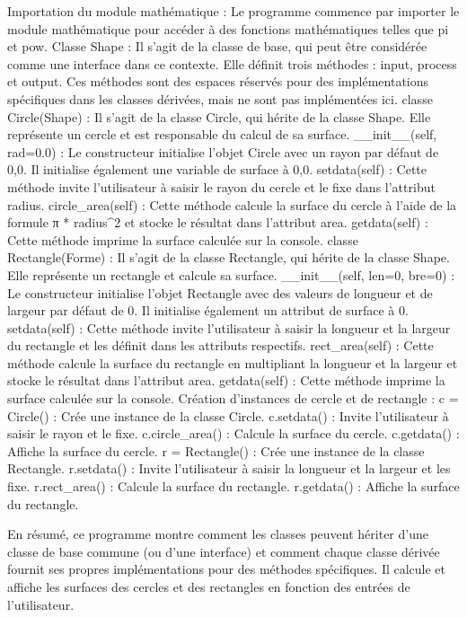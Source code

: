 \begin{solution}
    Importation du module mathématique : Le programme commence par importer le module mathématique pour accéder à des fonctions mathématiques telles que pi et pow.
    Classe Shape : Il s'agit de la classe de base, qui peut être considérée comme une interface dans ce contexte. Elle définit trois méthodes : input, process et output. Ces méthodes sont des espaces réservés pour des implémentations spécifiques dans les classes dérivées, mais ne sont pas implémentées ici.
    classe Circle(Shape) : Il s'agit de la classe Circle, qui hérite de la classe Shape. Elle représente un cercle et est responsable du calcul de sa surface.
        __init__(self, rad=0.0) : Le constructeur initialise l'objet Circle avec un rayon par défaut de 0,0. Il initialise également une variable de surface à 0,0.
        setdata(self) : Cette méthode invite l'utilisateur à saisir le rayon du cercle et le fixe dans l'attribut radius.
        circle_area(self) : Cette méthode calcule la surface du cercle à l'aide de la formule π * radius^2 et stocke le résultat dans l'attribut area.
        getdata(self) : Cette méthode imprime la surface calculée sur la console.
    classe Rectangle(Forme) : Il s'agit de la classe Rectangle, qui hérite de la classe Shape. Elle représente un rectangle et calcule sa surface.
        __init__(self, len=0, bre=0) : Le constructeur initialise l'objet Rectangle avec des valeurs de longueur et de largeur par défaut de 0. Il initialise également un attribut de surface à 0.
        setdata(self) : Cette méthode invite l'utilisateur à saisir la longueur et la largeur du rectangle et les définit dans les attributs respectifs.
        rect_area(self) : Cette méthode calcule la surface du rectangle en multipliant la longueur et la largeur et stocke le résultat dans l'attribut area.
        getdata(self) : Cette méthode imprime la surface calculée sur la console.
    Création d'instances de cercle et de rectangle :
        c = Circle() : Crée une instance de la classe Circle.
        c.setdata() : Invite l'utilisateur à saisir le rayon et le fixe.
        c.circle_area() : Calcule la surface du cercle.
        c.getdata() : Affiche la surface du cercle.
        r = Rectangle() : Crée une instance de la classe Rectangle.
        r.setdata() : Invite l'utilisateur à saisir la longueur et la largeur et les fixe.
        r.rect_area() : Calcule la surface du rectangle.
        r.getdata() : Affiche la surface du rectangle.

En résumé, ce programme montre comment les classes peuvent hériter d'une classe de base commune (ou d'une interface) et comment chaque classe dérivée fournit ses propres implémentations pour des méthodes spécifiques. Il calcule et affiche les surfaces des cercles et des rectangles en fonction des entrées de l'utilisateur.
        \end{solution}
        


